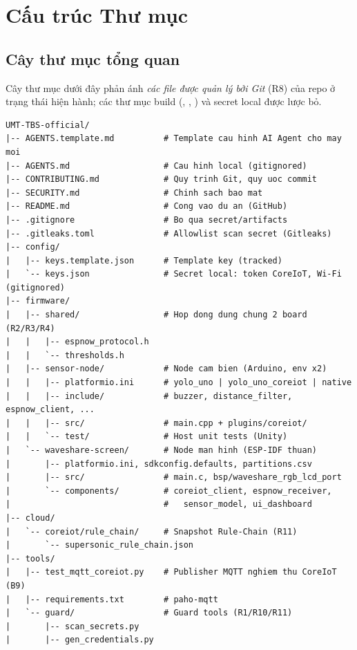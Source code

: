 \chapter{Cấu trúc Thư mục}
\label{ch:directory-structure}

\section{Cây thư mục tổng quan}
\label{sec:tree}

Cây thư mục dưới đây phản ánh \emph{các file được quản lý bởi Git} (R8) của repo
 ở trạng thái hiện hành; các thư mục build (,
, ) và secret local được lược bỏ.

\begin{verbatim}
UMT-TBS-official/
|-- AGENTS.template.md          # Template cau hinh AI Agent cho may moi
|-- AGENTS.md                   # Cau hinh local (gitignored)
|-- CONTRIBUTING.md             # Quy trinh Git, quy uoc commit
|-- SECURITY.md                 # Chinh sach bao mat
|-- README.md                   # Cong vao du an (GitHub)
|-- .gitignore                  # Bo qua secret/artifacts
|-- .gitleaks.toml              # Allowlist scan secret (Gitleaks)
|-- config/
|   |-- keys.template.json      # Template key (tracked)
|   `-- keys.json               # Secret local: token CoreIoT, Wi-Fi (gitignored)
|-- firmware/
|   |-- shared/                 # Hop dong dung chung 2 board (R2/R3/R4)
|   |   |-- espnow_protocol.h
|   |   `-- thresholds.h
|   |-- sensor-node/            # Node cam bien (Arduino, env x2)
|   |   |-- platformio.ini      # yolo_uno | yolo_uno_coreiot | native
|   |   |-- include/            # buzzer, distance_filter, espnow_client, ...
|   |   |-- src/                # main.cpp + plugins/coreiot/
|   |   `-- test/               # Host unit tests (Unity)
|   `-- waveshare-screen/       # Node man hinh (ESP-IDF thuan)
|       |-- platformio.ini, sdkconfig.defaults, partitions.csv
|       |-- src/                # main.c, bsp/waveshare_rgb_lcd_port
|       `-- components/         # coreiot_client, espnow_receiver,
|                               #   sensor_model, ui_dashboard
|-- cloud/
|   `-- coreiot/rule_chain/     # Snapshot Rule-Chain (R11)
|       `-- supersonic_rule_chain.json
|-- tools/
|   |-- test_mqtt_coreiot.py    # Publisher MQTT nghiem thu CoreIoT (B9)
|   |-- requirements.txt        # paho-mqtt
|   `-- guard/                  # Guard tools (R1/R10/R11)
|       |-- scan_secrets.py
|       |-- gen_credentials.py

\end{verbatim}
